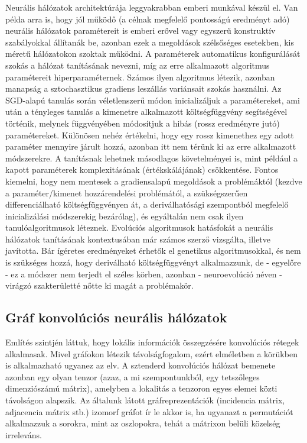Neurális hálózatok architektúrája leggyakrabban emberi munkával készül el. Van példa arra is, hogy jól működő (a célnak megfelelő pontosságú eredményt adó) neurális hálózatok paramétereit is emberi erővel vagy egyszerű konstruktív szabályokkal állítanák be, azonban ezek a megoldások szélsőséges esetekben, kis méretű hálózatokon szoktak működni. A paraméterek automatikus konfigurálását szokás a hálózat tanításának nevezni, míg az erre alkalmazott algoritmus paramétereit hiperparaméternek.
Számos ilyen algoritmus létezik, azonban manapság a sztochasztikus gradiens leszállás variánsait szokás használni. Az SGD-alapú tanulás során véletlenszerű módon inicializáljuk a paramétereket, ami után a tényleges tanulás a kimenetre alkalmazott költségfüggvény segítségével történik, melynek függvényében módosítjuk a hibás (rossz eredményre jutó) paramétereket. Különösen nehéz értékelni, hogy egy rossz kimenethez egy adott paraméter mennyire járult hozzá, azonban itt nem térünk ki az erre alkalmazott módszerekre. A tanításnak lehetnek másodlagos követelményei is, mint például a kapott paraméterek komplexitásának (értékskálájának) csökkentése. Fontos kiemelni, hogy nem mentesek a gradiensalapú megoldások a problémáktól (kezdve a paraméter/kimenet hozzárendelési problémától, a szükségszerűen differenciálható költségfüggvényen át, a deriválhatósági szempontból megfelelő inicializálási módszerekig bezárólag), és egyáltalán nem csak ilyen tanulóalgoritmusok léteznek. Evolúciós algoritmusok hatásfokát a neurális hálózatok tanításának kontextusában már számos szerző vizsgálta, illetve javította\cite{ann_ga, ann_ga2}. Bár ígéretes eredményeket érhetők el genetikus algoritmusokkal, és nem is szükséges hozzá, hogy deriválható költségfüggvényt alkalmazzunk, de - egyelőre - ez a módszer nem terjedt el széles körben, azonban - neuroevolúció néven - virágzó szakterületté nőtte ki magát a problémakör.

\subsection{Gráf konvolúciós neurális hálózatok} 
Említés szintjén láttuk, hogy lokális információk összegzésére konvolúciós rétegek alkalmasak. Mivel gráfokon létezik távolságfogalom, ezért elméletben a körükben is alkalmazható ugyanez az elv. A sztenderd konvolúciós hálózat bemenete azonban egy olyan tenzor (azaz, a mi szempontunkból, egy tetszőleges dimenziószámú mátrix), amelyben a lokalitás a tenzoron egyes elemei közti távolságon alapszik. Az általunk látott gráfreprezentációk (incidencia mátrix, adjacencia mátrix stb.) izomorf gráfot ír le akkor is, ha ugyanazt a permutációt alkalmazzuk a sorokra, mint az oszlopokra, tehát a mátrixon belüli közelség irreleváns.

